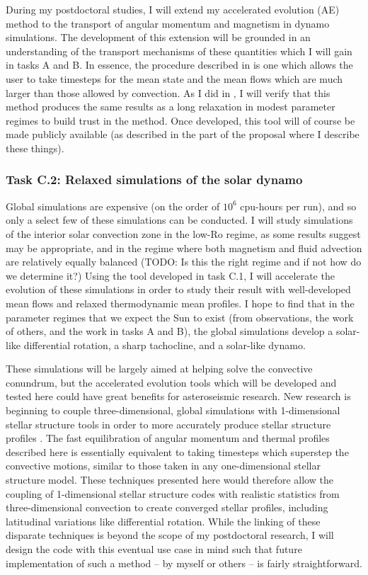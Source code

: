 \documentclass[aasms,12pt]{article}
\begin{document}
During my postdoctoral studies, I will extend my accelerated evolution (AE) method to the transport of angular momentum and magnetism in dynamo simulations.
The development of this extension will be grounded in an understanding of the transport mechanisms of these quantities which I will gain in tasks A and B.
In essence, the procedure described in \citet{ander&all2018} is one which allows the user to take timesteps for the mean state and the mean flows which are much larger than those allowed by convection.
As I did in \citet{anders&all2018}, I will verify that this method produces the same results as a long relaxation in modest parameter regimes to build trust in the method.
Once developed, this tool will of course be made publicly available (as described in the part of the proposal where I describe these things).

\subsubsection{Task C.2: Relaxed simulations of the solar dynamo}
Global simulations are expensive (on the order of $10^6$ cpu-hours per run), and so only a select few of these simulations can be conducted.
I will study simulations of the interior solar convection zone in the low-Ro regime, as some results suggest may be appropriate, and in the regime where both magnetism and fluid advection are relatively equally balanced (TODO: Is this the right regime and if not how do we determine it?)
Using the tool developed in task C.1, I will accelerate the evolution of these simulations in order to study their result with well-developed mean flows and relaxed thermodynamic mean profiles.
I hope to find that in the parameter regimes that we expect the Sun to exist (from observations, the work of others, and the work in tasks A and B), the global simulations develop a solar-like differential rotation, a sharp tachocline, and a solar-like dynamo.

These simulations will be largely aimed at helping solve the convective conundrum, but the accelerated evolution tools which will be developed and tested here could have great benefits for asteroseismic research.
New research is beginning to couple three-dimensional, global simulations with 1-dimensional stellar structure tools in order to more accurately produce stellar structure profiles \citep{jorgensen&weiss2019}.
The fast equilibration of angular momentum and thermal profiles described here is essentially equivalent to taking timesteps which superstep the convective motions, similar to those taken in any one-dimensional stellar structure model.
These techniques presented here would therefore allow the coupling of 1-dimensional stellar structure codes with realistic statistics from three-dimensional convection to create converged stellar profiles, including latitudinal variations like differential rotation.
While the linking of these disparate techniques is beyond the scope of my postdoctoral research, I will design the code with this eventual use case in mind such that future implementation of such a method -- by myself or others -- is fairly straightforward.
\end{document}
